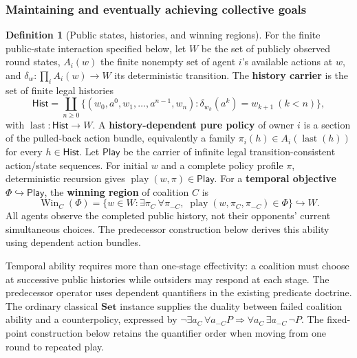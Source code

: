 \documentclass[11pt,a4paper]{article}
\numberwithin{equation}{section}
\theoremstyle{definition}
\newtheorem{definition}[theorem]{Definition}
\theoremstyle{remark}
\theoremstyle{plain}
\begin{document}
\subsubsection{Maintaining and eventually achieving collective goals}

\begin{definition}[Public states, histories, and winning regions]
\label{def:egt-public-state-winning-region}
For the finite public-state interaction specified below, let $W$ be the
set of publicly observed round states, $A_i(w)$ the finite nonempty
set of agent $i$'s available actions at $w$, and
$\delta_w:\prod_i A_i(w)\to W$ its deterministic transition.
The \textbf{history carrier} is the set of finite legal histories
\[
 \mathsf{Hist}=\coprod_{n\geq0}
 \{(w_0,a^0,w_1,\ldots,a^{n-1},w_n):
        \delta_{w_k}(a^k)=w_{k+1}\ (k<n)\},
\]
with $\operatorname{last}:\mathsf{Hist}\to W$.
A \textbf{history-dependent pure policy} of owner $i$ is a section
of the pulled-back action bundle, equivalently a family
$\pi_i(h)\in A_i(\operatorname{last}(h))$ for every $h\in\mathsf{Hist}$.
Let $\mathsf{Play}$ be the carrier of infinite legal
transition-consistent action/state sequences. For initial $w$ and a
complete policy profile $\pi$, deterministic recursion gives
$\operatorname{play}(w,\pi)\in\mathsf{Play}$.
For a \textbf{temporal objective} $\Phi\hookrightarrow\mathsf{Play}$,
the \textbf{winning region} of coalition $C$ is
\[
 \operatorname{Win}_C(\Phi)
 =\{w\in W:\exists\pi_C\ \forall\pi_{-C},\;
            \operatorname{play}(w,\pi_C,\pi_{-C})\in\Phi\}
 \hookrightarrow W.
\]
All agents observe the completed public history, not their opponents'
current simultaneous choices. The predecessor construction below
derives this ability using dependent action bundles.
\end{definition}
Temporal ability requires more than one-stage effectivity: a
coalition must choose at successive public histories while outsiders
may respond at each stage. The predecessor operator uses dependent
quantifiers in the existing predicate doctrine. The ordinary
classical $\mathbf{Set}$ instance supplies the duality between
failed coalition ability and a counterpolicy, expressed by
$\neg\exists a_C\,\forall a_{-C}P\Rightarrow
 \forall a_C\,\exists a_{-C}\,\neg P$.
The fixed-point construction below retains the quantifier order when
moving from one round to repeated play.
\end{document}
